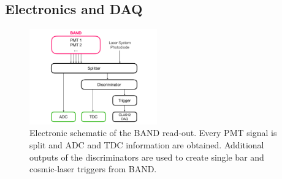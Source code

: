 \documentclass[3p,final,twocolumn]{elsarticle}
\begin{document}
\subsection{Electronics and DAQ}
\begin{figure}[tb]
	\centering
	\includegraphics[width=0.49\textwidth]{electronics-diag.pdf}
	\caption{Electronic schematic of the BAND read-out. Every PMT signal is split and ADC and TDC information are obtained. Additional outputs of the discriminators are used to create single bar and cosmic-laser triggers from BAND.}
	\label{fig:electronic-diag}
\end{figure}
\end{document}

